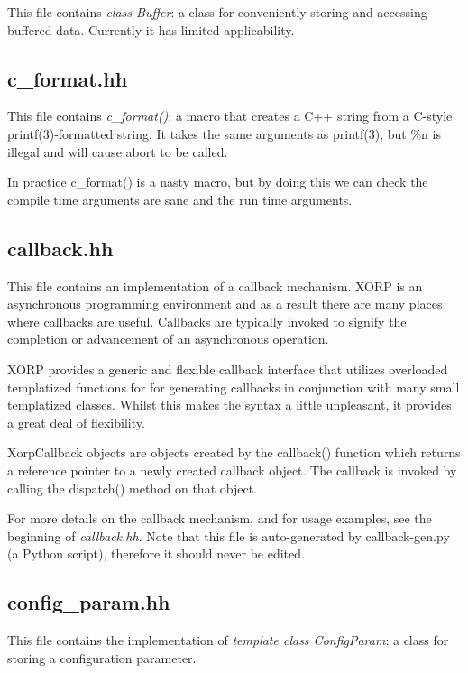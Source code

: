 \documentclass[11pt]{article}
\begin{document}
This file contains \emph{class Buffer}: a class for conveniently storing
and accessing buffered data.
Currently it has limited applicability.


\subsection{c\_format.hh}

This file contains \emph{c\_format()}: a macro that creates a C++ string
from a C-style printf(3)-formatted string.
It takes the same arguments as printf(3), but \%n is illegal and
will cause abort to be called.

In practice c\_format() is a nasty macro, but by doing this we can check
the compile time arguments are sane and the run time arguments.


\subsection{callback.hh}

This file contains an implementation of a callback mechanism.
XORP is an asynchronous programming environment and as a result there
are many places where callbacks are useful.  Callbacks are typically
invoked to signify the completion or advancement of an asynchronous
operation.

XORP provides a generic and flexible callback interface that utilizes
overloaded templatized functions for for generating callbacks
in conjunction with many small templatized classes. Whilst this makes
the syntax a little unpleasant, it provides a great deal of flexibility.

XorpCallback objects are objects created by the callback()
function which returns a reference pointer to a newly created
callback object.  The callback is invoked by calling the dispatch()
method on that object.

For more details on the callback mechanism, and for usage examples, see
the beginning of \emph{callback.hh}.
Note that this file is auto-generated by callback-gen.py (a Python script),
therefore it should never be edited.

\subsection{config\_param.hh}

This file contains the implementation of \emph{template class
ConfigParam}: a class for storing a configuration parameter.
\end{document}
